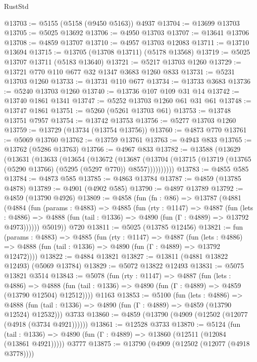 \begin{lexlean}{RustStd}
\begin{coremodule}
@13703 := @5155 (@5158 (@9450 @5163)) @4937
@13704 := @13699 @13703
@13705 := @5025 @13692
@13706 := @4950 @13703
@13707 := @13641 @13706
@13708 := @4859 @13707
@13710 := @4957 @13703 @12083
@13711 := @13710 @13694
@13715 := @13705 (@13708 @13711) (@5178 @13568)
@13719 := @5025 @13707 @13711 (@5183 @13640)
@13721 := @5217 @13703 @1260
@13729 := @13721 @770 @110 @677 @32 @1347 @3683 @1260 @833
@13731 := @5231 @13703 @1260
@13733 := @13731 @110 @677
@13734 := @13733 @3683
@13736 := @5240 @13703 @1260
@13740 := @13736 @107 @109 @31 @14
@13742 := @13740 @1861 @1341
@13747 := @5252 @13703 @1260 @61 @31 @61
@13748 := @13747 @1861
@13751 := @5260 (@5261 @13703 @61)
@13753 := @13748 @13751 @7957
@13754 := @13742 @13753
@13756 := @5277 @13703 @1260
@13759 := @13729 (@13734 (@13754 @13756))
@13760 := @4873 @770
@13761 := @5069 @13760
@13762 := @13759 @13761
@13763 := @4943 @833
@13765 := @13762 (@5286 @13763)
@13766 := @4967 @833
@13782 := @13588
    (@13629
      (@13631
        (@13633
          (@13654
            (@13672
              (@13687
                (@13704 (@13715 (@13719 (@13765 (@5290 @13766) (@5295 (@5297 @770)) @8557))))))))))
@13783 := @4855 @585
@13784 := @4873 @585
@13785 := @4863 @13784
@13787 := @4859 (@13785 @4878)
@13789 := @4901 (@4902 @585)
@13790 := @4897 @13789
@13792 := @4859 (@13790 @4926)
@13809 := @4858
    (fun (fn : @86) =>
    @13787
      (@4881
        (@4884
          (fun (params : @4883) =>
          @4885
            (fun (rty : @1147) =>
            @4887
              (fun (lets : @4886) =>
              @4888 (fun (tail : @1336) => @4890 (fun (Γ : @4889) => @13792 @4973))))))
        @5019))
    @720
@13811 := @5025 (@13785 @12456)
@13821 := fun (params : @4883) =>
  @4885
    (fun (rty : @1147) =>
    @4887
      (fun (lets : @4886) =>
      @4888 (fun (tail : @1336) => @4890 (fun (Γ : @4889) => @13792 @12472))))
@13822 := @4884 @13821
@13827 := @13811 (@4881 @13822 @12493) (@5069 @13784)
@13829 := @5072 @13822 @12493
@13831 := @5075 @13821 @3514
@13843 := @5078
    (fun (rty : @1147) =>
    @4887
      (fun (lets : @4886) =>
      @4888 (fun (tail : @1336) => @4890 (fun (Γ : @4889) => @4859 (@13790 @12504) @12512))))
    @1163
@13853 := @5100
    (fun (lets : @4886) =>
    @4888 (fun (tail : @1336) => @4890 (fun (Γ : @4889) => @4859 (@13790 @12524) @12532)))
    @3733
@13860 := @4859 (@13790 (@4909 (@12502 (@12077 (@4918 (@3734 @4921))))))
@13861 := @12528 @3733
@13870 := @5124
    (fun (tail : @1336) => @4890 (fun (Γ : @4889) => @13860 (@12511 (@12084 (@13861 @4921)))))
    @3777
@13875 := @13790 (@4909 (@12502 (@12077 (@4918 @3778))))

\end{coremodule}
\end{lexlean}
